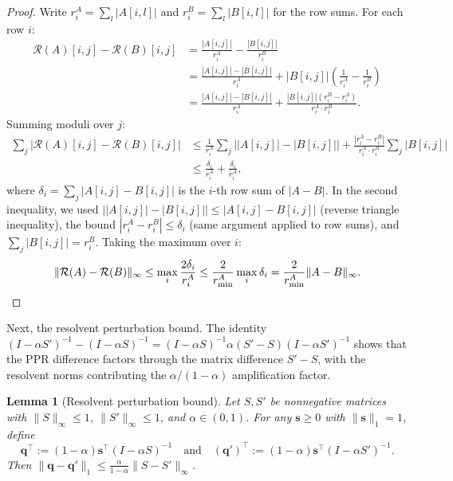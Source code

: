 \documentclass{article}
\theoremstyle{plain}
\newtheorem{lemma}[theorem]{Lemma}
\theoremstyle{definition}
\newcommand{\norm}[1]{\| #1 \|}
\def\tp{\intercal}
\newcommand{\arXivtag}[1][]{#1}
\begin{document}
\begin{proof}%
	Write $r_i^A = \sum_l |A[i,l]|$ and $r_i^B = \sum_l |B[i,l]|$ for the row sums. For each row $i$:
	\begin{align*}
		\mathcal{R}(A)[i,j] - \mathcal{R}(B)[i,j] &= \frac{|A[i,j]|}{r_i^A} - \frac{|B[i,j]|}{r_i^B} \\
		&= \frac{|A[i,j]| - |B[i,j]|}{r_i^A} + |B[i,j]|\left(\frac{1}{r_i^A} - \frac{1}{r_i^B}\right) \\
		&= \frac{|A[i,j]| - |B[i,j]|}{r_i^A} + \frac{|B[i,j]|(r_i^B - r_i^A)}{r_i^A \cdot r_i^B}.
	\end{align*}
	Summing moduli over $j$:
	\begin{align*}
		\sum_j \left|\mathcal{R}(A)[i,j] - \mathcal{R}(B)[i,j]\right| &\leq \frac{1}{r_i^A}\sum_j \bigl||A[i,j]| - |B[i,j]|\bigr| + \frac{|r_i^A - r_i^B|}{r_i^A \cdot r_i^B}\sum_j |B[i,j]| \\
		&\leq \frac{\delta_i}{r_i^A} + \frac{\delta_i}{r_i^A},
	\end{align*}
	where $\delta_i = \sum_j |A[i,j] - B[i,j]|$ is the $i$-th row sum of $|A - B|$. In the second inequality, we used $\bigl||A[i,j]| - |B[i,j]|\bigr| \leq |A[i,j] - B[i,j]|$ (reverse triangle inequality), the bound $|r_i^A - r_i^B| \leq \delta_i$ (same argument applied to row sums), and $\sum_j |B[i,j]| = r_i^B$. Taking the maximum over $i$:
	\begin{equation*}
		\norm{\mathcal{R}(A) - \mathcal{R}(B)}_\infty \leq \max_i \frac{2\delta_i}{r_i^A} \leq \frac{2}{r^A_{\min}} \max_i \delta_i = \frac{2}{r^A_{\min}} \norm{A-B}_\infty. \qedhere
	\end{equation*}
\end{proof}


Next, the resolvent perturbation bound. The identity $(I - \alpha S')^{-1} - (I - \alpha S)^{-1} = (I - \alpha S)^{-1}\alpha(S'-S)(I - \alpha S')^{-1}$ shows that the PPR difference factors through the matrix difference $S' - S$, with the resolvent norms contributing the $\alpha/(1-\alpha)$ amplification factor.



\begin{lemma}[Resolvent perturbation bound]\label{lem:pagerank-perturbation}
	Let $S, S'$ be nonnegative matrices with $\|S\|_\infty \leq 1$,
	$\|S'\|_\infty \leq 1$, and $\alpha \in (0,1)$. For any
	$\mathbf{s} \geq 0$ with $\|\mathbf{s}\|_1 = 1$, define
	\[
	\mathbf{q}^\tp := (1-\alpha)\mathbf{s}^\tp(I-\alpha S)^{-1} \quad \arXivtag[\text{and}]
	\quad
	(\mathbf{q}')^\tp := (1-\alpha)\mathbf{s}^\tp(I-\alpha S')^{-1}.
	\]
	Then $\|\mathbf{q} - \mathbf{q}'\|_1 \leq
	\frac{\alpha}{1-\alpha}\|S - S'\|_\infty$.
\end{lemma}
\end{document}
